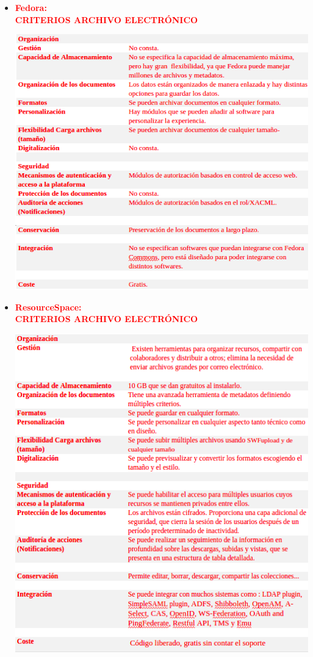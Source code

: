 \documentclass{article}
\begin{document}
\begin{itemize}
\item \textcolor{Red}{\textbf{Fedora:}}\\
\textcolor{Red}{\textbf{CRITERIOS ARCHIVO ELECTRÓNICO}}
\begin{center}
\includegraphics[scale=0.5]{images/earch2.png}
\end{center}
\item \textcolor{Red}{\textbf{ResourceSpace:}}\\
\textcolor{Red}{\textbf{CRITERIOS ARCHIVO ELECTRÓNICO}}
\begin{center}
\includegraphics[scale=0.5]{images/earch3.png}
\end{center}
\end{itemize}
\end{document}
